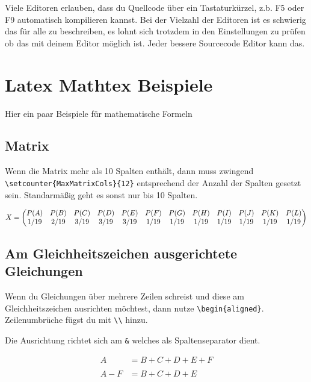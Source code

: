 \documentclass[
    12pt,
    a4paper,
            ngerman,
        bibliography=totocnumbered,
    listof=totocnumbered
]{scrartcl}
\begin{document}
Viele Editoren erlauben, dass du Quellcode über ein Tastaturkürzel, z.b.
F5 oder F9 automatisch kompilieren kannst. Bei der Vielzahl der Editoren
ist es schwierig das für alle zu beschreiben, es lohnt sich trotzdem in
den Einstellungen zu prüfen ob das mit deinem Editor möglich ist. Jeder
bessere Sourcecode Editor kann das.

\hypertarget{latex-mathtex-beispiele}{%
\section{Latex Mathtex Beispiele}\label{latex-mathtex-beispiele}}

Hier ein paar Beispiele für mathematische Formeln

\hypertarget{matrix}{%
\subsection{Matrix}\label{matrix}}

Wenn die Matrix mehr als 10 Spalten enthält, dann muss zwingend
\texttt{\textbackslash{}setcounter\{MaxMatrixCols\}\{12\}} entsprechend
der Anzahl der Spalten gesetzt sein. Standarmäßig geht es sonst nur bis
10 Spalten.

\[
\setcounter{MaxMatrixCols}{12}X = 
 \begin{pmatrix}
P(A) & P(B) & P(C) & P(D) & P(E) & P(F) & P(G) & P(H) & P(I) & P(J) & P(K) & P(L)\\
1/19 & 2/19 & 3/19 & 3/19 & 3/19 & 1/19 & 1/19 & 1/19 & 1/19 & 1/19 & 1/19 & 1/19\\
\end{pmatrix}\]

\hypertarget{am-gleichheitszeichen-ausgerichtete-gleichungen}{%
\subsection{Am Gleichheitszeichen ausgerichtete
Gleichungen}\label{am-gleichheitszeichen-ausgerichtete-gleichungen}}

Wenn du Gleichungen über mehrere Zeilen schreist und diese am
Gleichheitszeichen ausrichten möchtest, dann nutze
\texttt{\textbackslash{}begin\{aligned\}}. Zeilenumbrüche fügst du mit
\texttt{\textbackslash{}\textbackslash{}} hinzu.

Die Ausrichtung richtet sich am \texttt{\&} welches als Spaltenseparator
dient.

\[ \displaystyle
\begin{aligned}
A &  = B + C + D + E + F\\
& \\
 A - F & = B + C + D + E 
\end{aligned}\]






%
\end{document}

